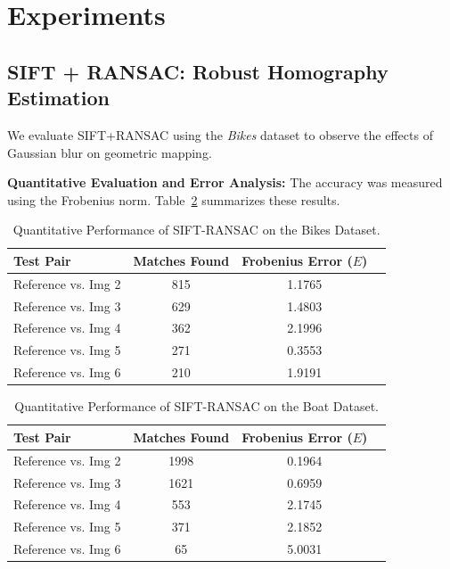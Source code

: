 \documentclass{article}
\begin{document}
\section{Experiments}
\label{sec:Experiments}

\subsection{SIFT + RANSAC: Robust Homography Estimation}
We evaluate SIFT+RANSAC using the \textit{Bikes} dataset to observe the effects of Gaussian blur on geometric mapping. 

\textbf{Quantitative Evaluation and Error Analysis:}
The accuracy was measured using the Frobenius norm. Table~\ref{tab:sift_results} summarizes these results.

\begin{table}[H]
\centering
\caption{Quantitative Performance of SIFT-RANSAC on the Bikes Dataset.}
\label{tab:sift_results}
\begin{tabular}{lccc}
\toprule
\textbf{Test Pair} & \textbf{Matches Found} & \textbf{Frobenius Error ($E$)} \\ \midrule
Reference vs. Img 2    & 815                    & 1.1765                        \\
Reference vs. Img 3    & 629                    & 1.4803                        \\
Reference vs. Img 4    & 362                    & 2.1996                        \\
Reference vs. Img 5    & 271                    & 0.3553                        \\
Reference vs. Img 6    & 210                    & 1.9191                        \\ \bottomrule
\end{tabular}
\end{table}

\begin{table}[H]
\centering
\caption{Quantitative Performance of SIFT-RANSAC on the Boat Dataset.}
\label{tab:sift_results}
\begin{tabular}{lccc}
\toprule
\textbf{Test Pair} & \textbf{Matches Found} & \textbf{Frobenius Error ($E$)} \\ \midrule
Reference vs. Img 2    & 1998                    & 0.1964                        \\
Reference vs. Img 3    & 1621                    & 0.6959                        \\
Reference vs. Img 4    & 553                    & 2.1745                        \\
Reference vs. Img 5    & 371                    & 2.1852                        \\
Reference vs. Img 6    & 65                    & 5.0031                        \\ \bottomrule
\end{tabular}
\end{table}
\end{document}
